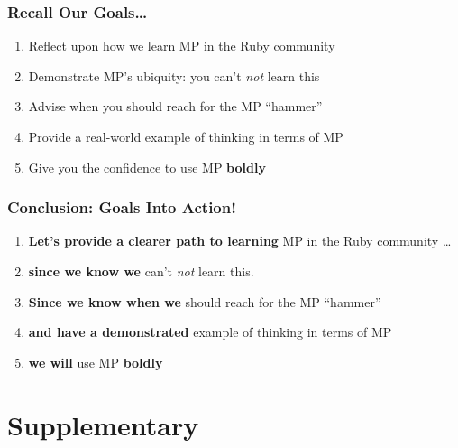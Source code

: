 \documentclass[slidestop,compress,mathserif]{beamer}
\begin{document}
\begin{frame}
	\frametitle{Recall Our Goals\ldots}
	\begin{enumerate}
		\item Reflect upon how we learn MP in the Ruby community
		\item Demonstrate MP's ubiquity:  you can't \emph{not} learn this
		\item Advise when you should reach for the MP ``hammer''
		\item Provide a real-world example of thinking in terms of MP
		\item Give you the confidence to use MP \textbf{boldly}
	\end{enumerate}
\end{frame}


\begin{frame}
	\frametitle{Conclusion:  Goals Into Action!}
	\begin{enumerate}
		\item \textbf{Let's provide a clearer path to learning} MP in the Ruby community \ldots
		\pause
		\item \textbf{since we know we} can't \emph{not} learn this.
		\pause
		\item \textbf{Since we know when we} should reach for the MP ``hammer''
		\pause
		\item \textbf{and have a demonstrated} example of thinking in terms of MP
		\pause
		\item \textbf{we will} use MP \textbf{boldly}
	\end{enumerate}
\end{frame}







\section{Supplementary} %
\label{sec:supplementary}
\end{document}
